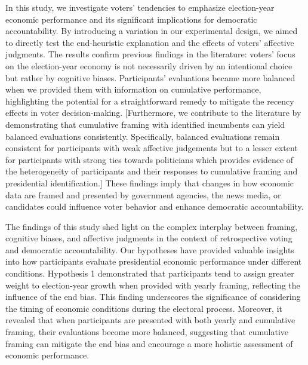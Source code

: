 \documentclass[
]{article}
\begin{document}
In this study, we investigate voters' tendencies to emphasize
election-year economic performance and its significant implications for
democratic accountability. By introducing a variation in our
experimental design, we aimed to directly test the end-heuristic
explanation and the effects of voters' affective judgments. The results
confirm previous findings in the literature: voters' focus on the
election-year economy is not necessarily driven by an intentional choice
but rather by cognitive biases. Participants' evaluations became more
balanced when we provided them with information on cumulative
performance, highlighting the potential for a straightforward remedy to
mitigate the recency effects in voter decision-making. {[}Furthermore,
we contribute to the literature by demonstrating that cumulative framing
with identified incumbents can yield balanced evaluations consistently.
Specifically, balanced evaluations remain consistent for participants
with weak affective judgements but to a lesser extent for participants
with strong ties towards politicians which provides evidence of the
heterogeneity of participants and their responses to cumulative framing
and presidential identification.{]} These findings imply that changes in
how economic data are framed and presented by government agencies, the
news media, or candidates could influence voter behavior and enhance
democratic accountability.

The findings of this study shed light on the complex interplay between
framing, cognitive biases, and affective judgments in the context of
retrospective voting and democratic accountability. Our hypotheses have
provided valuable insights into how participants evaluate presidential
economic performance under different conditions. Hypothesis 1
demonstrated that participants tend to assign greater weight to
election-year growth when provided with yearly framing, reflecting the
influence of the end bias. This finding underscores the significance of
considering the timing of economic conditions during the electoral
process. Moreover, it revealed that when participants are presented with
both yearly and cumulative framing, their evaluations become more
balanced, suggesting that cumulative framing can mitigate the end bias
and encourage a more holistic assessment of economic performance.
\end{document}
